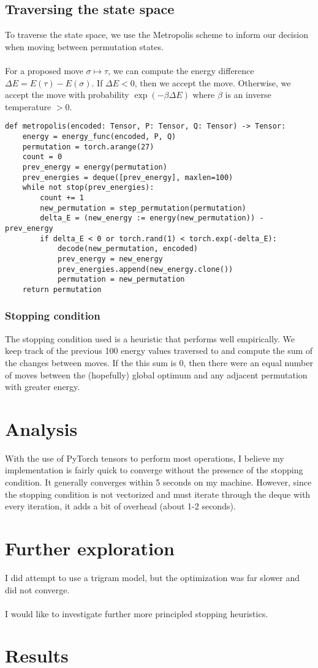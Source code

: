 \documentclass[11pt]{article}
\begin{document}
\subsection{Traversing the state space}
To traverse the state space, we use the Metropolis scheme to inform our decision when moving between permutation states.
\\\\
For a proposed move $\sigma \mapsto \tau$, we can compute the energy difference $\Delta E = E(\tau) - E(\sigma)$. If $\Delta E < 0$, then we accept the move. Otherwise, we accept the move with probability $\exp(-\beta\Delta E)$ where $\beta$ is an inverse temperature $> 0$.
\begin{verbatim}
def metropolis(encoded: Tensor, P: Tensor, Q: Tensor) -> Tensor:
    energy = energy_func(encoded, P, Q)
    permutation = torch.arange(27)
    count = 0
    prev_energy = energy(permutation)
    prev_energies = deque([prev_energy], maxlen=100)
    while not stop(prev_energies):
        count += 1
        new_permutation = step_permutation(permutation)
        delta_E = (new_energy := energy(new_permutation)) - prev_energy
        if delta_E < 0 or torch.rand(1) < torch.exp(-delta_E):
            decode(new_permutation, encoded)
            prev_energy = new_energy
            prev_energies.append(new_energy.clone())
            permutation = new_permutation
    return permutation
\end{verbatim}

\subsubsection{Stopping condition}
The stopping condition used is a heuristic that performs well empirically. We keep track of the previous 100 energy values traversed to and compute the sum of the changes between moves. If the this sum is 0, then there were an equal number of moves between the (hopefully) global optimum and any adjacent permutation with greater energy.

\pagebreak

\section{Analysis}
With the use of PyTorch tensors to perform most operations, I believe my implementation is fairly quick to converge without the presence of the stopping condition. It generally converges within 5 seconds on my machine. However, since the stopping condition is not vectorized and must iterate through the deque with every iteration, it adds a bit of overhead (about 1-2 seconds).

\pagebreak

\section{Further exploration}
I did attempt to use a trigram model, but the optimization was far slower and did not converge.
\\\\
I would like to investigate further more principled stopping heuristics.

\pagebreak

\section{Results}
\end{document}
